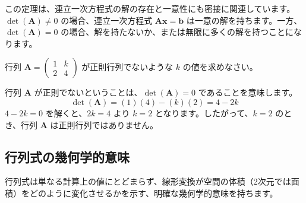 この定理は、連立一次方程式の解の存在と一意性にも密接に関連しています。$\det(\bm{A}) \neq 0$ の場合、連立一次方程式 $\bm{A}\bm{x} = \bm{b}$ は一意の解を持ちます。一方、$\det(\bm{A}) = 0$ の場合、解を持たないか、または無限に多くの解を持つことになります。

\begin{ex}
行列 $\bm{A} = \begin{pmatrix} 1 & k \\ 2 & 4 \end{pmatrix}$ が正則行列でないような $k$ の値を求めなさい。\par
行列 $\bm{A}$ が正則でないということは、$\det(\bm{A}) = 0$ であることを意味します。
\[ \det(\bm{A}) = (1)(4) - (k)(2) = 4 - 2k \]
$4 - 2k = 0$ を解くと、$2k = 4$ より $k = 2$ となります。したがって、$k=2$ のとき、行列 $\bm{A}$ は正則行列ではありません。
\end{ex}

\subsection{行列式の幾何学的意味}

行列式は単なる計算上の値にとどまらず、線形変換が空間の体積（2次元では面積）をどのように変化させるかを示す、明確な幾何学的意味を持ちます。

